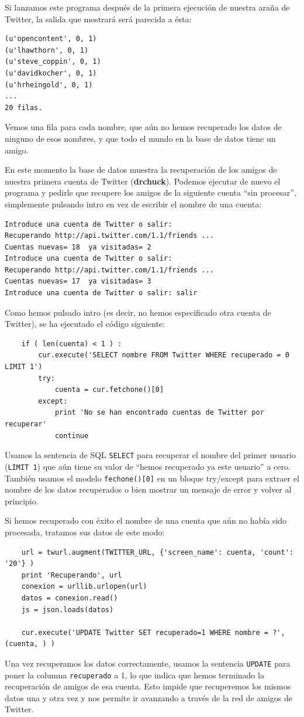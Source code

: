 Si lanzamos este programa después de la primera ejecución de nuestra araña
de Twitter, la salida que mostrará será parecida a ésta:

\beforeverb
\begin{verbatim}
(u'opencontent', 0, 1)
(u'lhawthorn', 0, 1)
(u'steve_coppin', 0, 1)
(u'davidkocher', 0, 1)
(u'hrheingold', 0, 1)
...
20 filas.
\end{verbatim}
\afterverb
%
Vemos una fila para cada nombre, que aún no hemos
recuperado los datos de ninguno de esos nombres, y
que todo el mundo en la base de datos tiene un amigo.

En este momento la base de datos muestra la recuperación de los amigos de
nuestra primera cuenta de Twitter ({\bf drchuck}). Podemos ejecutar de nuevo
el programa y pedirle que recupere los amigos de la siguiente
cuenta ``sin procesar'', simplemente pulsando intro en vez de
escribir el nombre de una cuenta:

\beforeverb
\begin{verbatim}
Introduce una cuenta de Twitter o salir:  
Recuperando http://api.twitter.com/1.1/friends ...
Cuentas nuevas= 18  ya visitadas= 2
Introduce una cuenta de Twitter o salir: 
Recuperando http://api.twitter.com/1.1/friends ...
Cuentas nuevas= 17  ya visitadas= 3
Introduce una cuenta de Twitter o salir: salir
\end{verbatim}
\afterverb
%
Como hemos pulsado intro (es decir, no hemos especificado otra cuenta de Twitter),
se ha ejecutado el código siguiente:

\beforeverb
\begin{verbatim}
    if ( len(cuenta) < 1 ) :
        cur.execute('SELECT nombre FROM Twitter WHERE recuperado = 0 LIMIT 1')
        try:
            cuenta = cur.fetchone()[0]
        except:
            print 'No se han encontrado cuentas de Twitter por recuperar'
            continue
\end{verbatim}
\afterverb
%
Usamos la sentencia de SQL {\tt SELECT} para recuperar el nombre del primer
usuario ({\tt LIMIT 1}) que aún tiene su valor de ``hemos recuperado ya este usuario''
a cero. También usamos el modelo {\tt fechone()[0]} en un bloque
try/except para extraer el nombre de los datos recuperados o bien
mostrar un mensaje de error y volver al principio.

Si hemos recuperado con éxito el nombre de una cuenta que aún no había sido procesada,
tratamos sus datos de este modo:

\beforeverb
\begin{verbatim}
    url = twurl.augment(TWITTER_URL, {'screen_name': cuenta, 'count': '20'} )
    print 'Recuperando', url
    conexion = urllib.urlopen(url)
    datos = conexion.read()
    js = json.loads(datos)

    cur.execute('UPDATE Twitter SET recuperado=1 WHERE nombre = ?', (cuenta, ) )
\end{verbatim}
\afterverb
%
Una vez recuperamos los datos correctamente, usamos la sentencia {\tt UPDATE}
para poner la columna {\tt recuperado} a 1, lo que indica que hemos terminado
la recuperación de amigos de esa cuenta. Esto impide que recuperemos los
mismos datos una y otra vez y nos permite ir avanzando a través de la red
de amigos de Twitter. 

